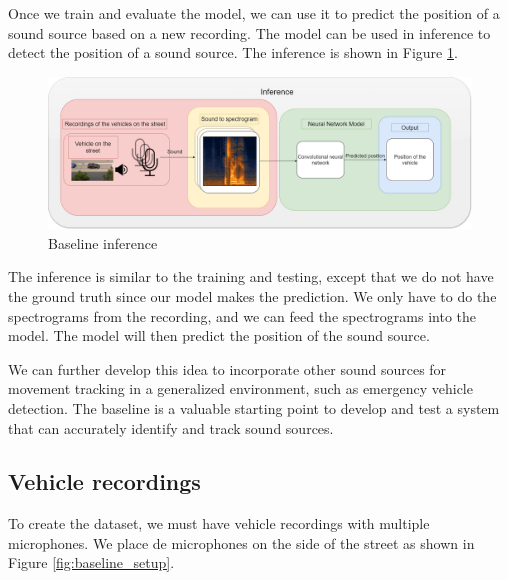 Once we train and evaluate the model, we can use it to predict the position of a sound source based on a new recording. The model can be used in inference to detect the position of a sound source. The inference is shown in Figure \ref{fig:baseline_inference}.

\begin{figure}[H]
    \centering
    \includegraphics[width=1\textwidth]{../Images/baseline_inference.png}
    \caption{Baseline inference}
    \label{fig:baseline_inference}
\end{figure}

The inference is similar to the training and testing, except that we do not have the ground truth since our model makes the prediction. We only have to do the spectrograms from the recording, and we can feed the spectrograms into the model. The model will then predict the position of the sound source.

We can further develop this idea to incorporate other sound sources for movement tracking in a generalized environment, such as emergency vehicle detection. The baseline is a valuable starting point to develop and test a system that can accurately identify and track sound sources.

\subsection{Vehicle recordings}
\label{sec:vehicle_recordings}
To create the dataset, we must have vehicle recordings with multiple microphones. We place de microphones on the side of the street as shown in Figure \ref{fig:baseline_setup}.

